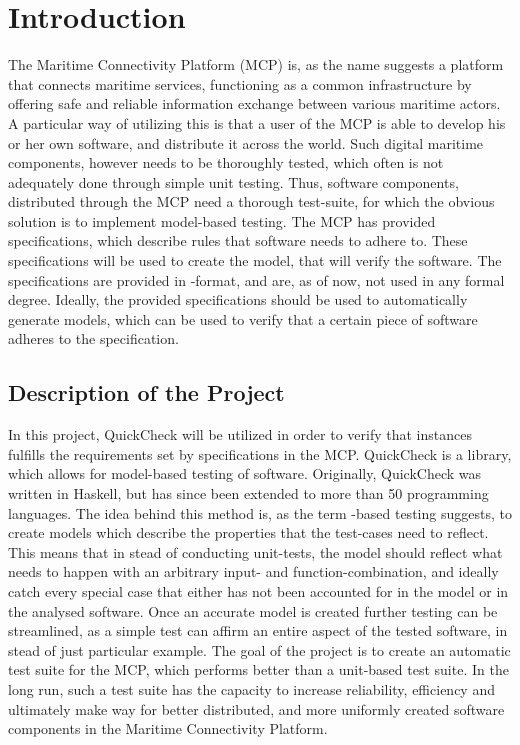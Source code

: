 \chapter{Introduction}
The Maritime Connectivity Platform \cite{mcp} (MCP) is, as the name suggests a platform that connects maritime services, functioning as a common infrastructure by offering safe and reliable information exchange between various maritime actors. A particular way of utilizing this is that a user of the MCP is able to develop his or her own software, and distribute it across the world. Such digital maritime components, however needs to be thoroughly tested, which often is not adequately done through simple unit testing. Thus, software components, distributed through the MCP need a thorough test-suite, for which the obvious solution is to implement model-based testing.
The MCP has provided specifications, which describe rules that software needs to adhere to. These specifications will be used to create the model, that will verify the software. The specifications are provided in -format, and are, as of now, not used in any formal degree. Ideally, the provided specifications should be used to automatically generate models, which can be used to verify that a certain piece of software adheres to the specification. 
\section{Description of the Project}
In this project, QuickCheck \cite{quickcheck} will be utilized in order to verify that instances fulfills the requirements set by specifications in the MCP.
QuickCheck is a library, which allows for model-based testing of software. Originally, QuickCheck was written in Haskell, but has since been extended to more than 50 programming languages. The idea behind this method is, as the term -based testing suggests, to create models which describe the properties that the test-cases need to reflect. This means that in stead of conducting unit-tests, the model should reflect what needs to happen with an arbitrary input- and function-combination, and ideally catch every special case that either has not been accounted for in the model or in the analysed software.
Once an accurate model is created further testing can be streamlined, as a simple test can affirm an entire aspect of the tested software, in stead of just  particular example.
The goal of the project is to create an automatic test suite for the MCP, which performs better than a unit-based test suite. In the long run, such a test suite has the capacity to increase reliability, efficiency and ultimately make way for better distributed, and more uniformly created software components in the Maritime Connectivity Platform. 
